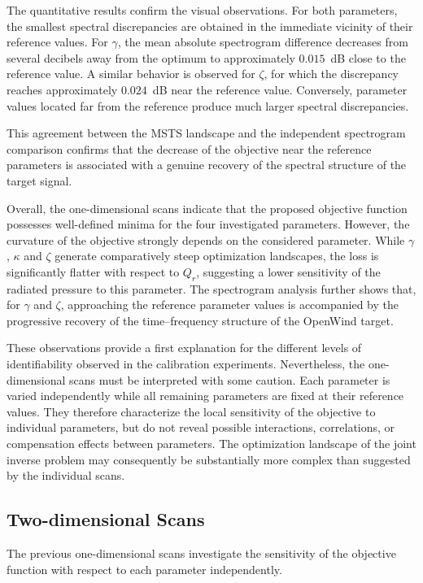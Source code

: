 \documentclass[11pt,a4paper]{report}
\theoremstyle{plain}
\theoremstyle{definition}
\begin{document}
The quantitative results confirm the visual observations. For both parameters,
the smallest spectral discrepancies are obtained in the immediate vicinity of
their reference values. For $\gamma$, the mean absolute spectrogram difference
decreases from several decibels away from the optimum to approximately
$0.015$~dB close to the reference value. A similar behavior is observed for
$\zeta$, for which the discrepancy reaches approximately $0.024$~dB near the
reference value. Conversely, parameter values located far from the reference
produce much larger spectral discrepancies.

This agreement between the MSTS landscape and the independent spectrogram
comparison confirms that the decrease of the objective near the reference
parameters is associated with a genuine recovery of the spectral structure
of the target signal.

Overall, the one-dimensional scans indicate that the proposed objective
function possesses well-defined minima for the four investigated parameters.
However, the curvature of the objective strongly depends on the considered
parameter. While $\gamma$, $\kappa$ and $\zeta$ generate comparatively steep
optimization landscapes, the loss is significantly flatter with respect to
$Q_r$, suggesting a lower sensitivity of the radiated pressure to this
parameter. The spectrogram analysis further shows that, for $\gamma$ and
$\zeta$, approaching the reference parameter values is accompanied by the
progressive recovery of the time--frequency structure of the OpenWind target.

These observations provide a first explanation for the different levels of
identifiability observed in the calibration experiments. Nevertheless, the
one-dimensional scans must be interpreted with some caution. Each parameter
is varied independently while all remaining parameters are fixed at their
reference values. They therefore characterize the local sensitivity of the
objective to individual parameters, but do not reveal possible interactions,
correlations, or compensation effects between parameters. The optimization
landscape of the joint inverse problem may consequently be substantially more
complex than suggested by the individual scans.

\subsection{Two-dimensional Scans}

The previous one-dimensional scans investigate the sensitivity of the
objective function with respect to each parameter independently.
\end{document}

